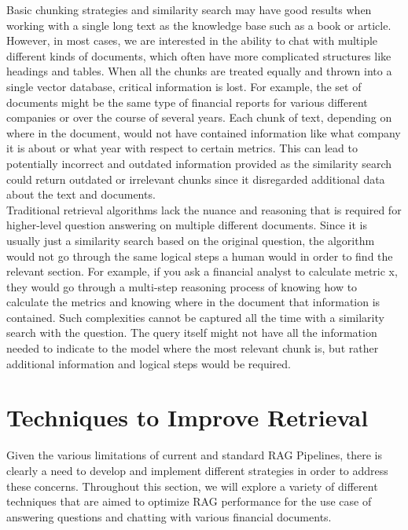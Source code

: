 \documentclass{article}
\begin{document}
    \noindent Basic chunking strategies and similarity search may have good results when working with a single long text as the knowledge base such as a book or article. However, in most cases, we are interested in the ability to chat with multiple different kinds of documents, which often have more complicated structures like headings and tables. When all the chunks are treated equally and thrown into a single vector database, critical information is lost. For example, the set of documents might be the same type of financial reports for various different companies or over the course of several years. Each chunk of text, depending on where in the document,  would not have contained information like what company it is about or what year with respect to certain metrics. This can lead to potentially incorrect and outdated information provided as the similarity search could return outdated or irrelevant chunks since it disregarded additional data about the text and documents.  
    \\
    
    \noindent Traditional retrieval algorithms lack the nuance and reasoning that is required for higher-level question answering on multiple different documents. Since it is usually just a similarity search based on the original question, the algorithm would not go through the same logical steps a human would in order to find the relevant section. For example, if you ask a financial analyst to calculate metric x, they would go through a multi-step reasoning process of knowing how to calculate the metrics and knowing where in the document that information is contained. Such complexities cannot be captured all the time with a similarity search with the question. The query itself might not have all the information needed to indicate to the model where the most relevant chunk is, but rather additional information and logical steps would be required. 


    \section{Techniques to Improve Retrieval}
    Given the various limitations of current and standard RAG Pipelines, there is clearly a need to develop and implement different strategies in order to address these concerns. Throughout this section, we will explore a variety of different techniques that are aimed to optimize RAG performance for the use case of answering questions and chatting with various financial documents. 
\end{document}

